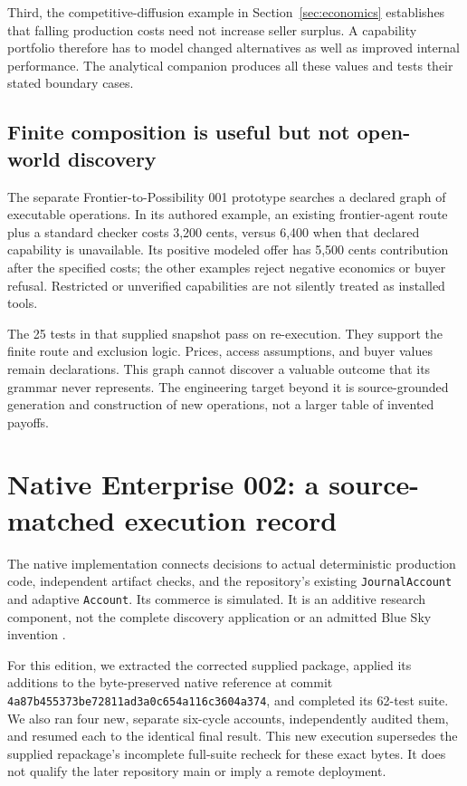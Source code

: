 \documentclass[11pt,letterpaper]{article}
\theoremstyle{remark}\newtheorem{remark}{Remark}[section]
\begin{document}
Third, the competitive-diffusion example in Section~\ref{sec:economics} establishes that falling production costs need not increase seller surplus. A capability portfolio therefore has to model changed alternatives as well as improved internal performance. The analytical companion produces all these values and tests their stated boundary cases.

\subsection{Finite composition is useful but not open-world discovery}
The separate Frontier-to-Possibility 001 prototype \citep{composition001} searches a declared graph of executable operations. In its authored example, an existing frontier-agent route plus a standard checker costs 3,200 cents, versus 6,400 when that declared capability is unavailable. Its positive modeled offer has 5,500 cents contribution after the specified costs; the other examples reject negative economics or buyer refusal. Restricted or unverified capabilities are not silently treated as installed tools.

The 25 tests in that supplied snapshot pass on re-execution. They support the finite route and exclusion logic. Prices, access assumptions, and buyer values remain declarations. This graph cannot discover a valuable outcome that its grammar never represents. The engineering target beyond it is source-grounded generation and construction of new operations, not a larger table of invented payoffs.

\section{Native Enterprise 002: a source-matched execution record}\label{sec:native}
The native implementation connects decisions to actual deterministic production code, independent artifact checks, and the repository's existing \texttt{JournalAccount} and adaptive \texttt{Account}. Its commerce is simulated. It is an additive research component, not the complete discovery application or an admitted Blue Sky invention \citep{native002}.

For this edition, we extracted the corrected supplied package, applied its additions to the byte-preserved native reference at commit \texttt{4a87b455373be72811ad3a0c654a116c3604a374}, and completed its 62-test suite. We also ran four new, separate six-cycle accounts, independently audited them, and resumed each to the identical final result. This new execution supersedes the supplied repackage's incomplete full-suite recheck for these exact bytes. It does not qualify the later repository main or imply a remote deployment.
\end{document}
